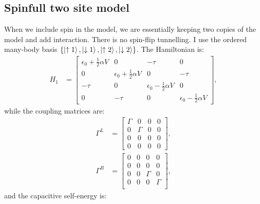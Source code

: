\subsection{Spinfull two site model}
When we include spin in the model, we are essentially keeping two copies of the model and add interaction. There is no spin-flip tunnelling. I use the ordered many-body basis $\left\{ \ket{\uparrow 1}, \ket{\downarrow 1}, \ket{\uparrow 2}, \ket{\downarrow 2}\right\}$. The Hamiltonian is:
\begin{align}
H_1 &= \begin{bmatrix} \epsilon_0 + \frac{1}{2} \alpha V & 0 & -\tau & 0 \\ 0 & \epsilon_0 + \frac{1}{2} \alpha V & 0 & -\tau\\ -\tau & 0 & \epsilon_0 - \frac{1}{2} \alpha V & 0 \\ 0 & -\tau & 0 & \epsilon_0 - \frac{1}{2} \alpha V\end{bmatrix},
\label{eq:spinfullhamiltonian}
\end{align} 
while the coupling matrices are:
\begin{align*}
\Gamma^L &= \begin{bmatrix} \Gamma & 0 & 0 & 0 \\ 0 & \Gamma & 0 & 0 \\ 0 & 0 & 0 & 0 \\  0 & 0 & 0 & 0\end{bmatrix},\\ \Gamma^R &= \begin{bmatrix} 0 & 0 & 0 & 0 \\ 0 & 0 & 0 & 0 \\ 0 & 0 & \Gamma & 0 \\ 0 & 0 & 0 & \Gamma \\ \end{bmatrix},
\end{align*}
and the capacitive self-energy is:
